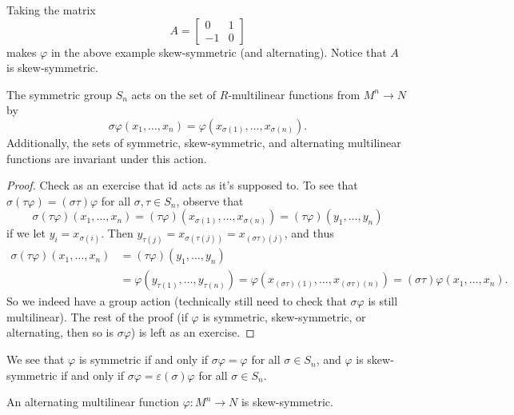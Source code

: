 \begin{example}
  Taking the matrix
  \[
    A = \begin{bmatrix} 0 & 1 \\ -1 & 0 \end{bmatrix}
  \]
  makes $\varphi$ in the above example skew-symmetric
  (and alternating).
  Notice that $A$ is skew-symmetric.
\end{example}

\begin{lemma}
  The symmetric group $S_n$ acts on the
  set of $R$-multilinear functions from $M^n \to N$
  by
  \[
    \sigma \varphi(x_1, \dots, x_n)
    = \varphi(x_{\sigma(1)}, \dots, x_{\sigma(n)}).
  \]
  Additionally, the sets of symmetric, skew-symmetric, and alternating
  multilinear functions are invariant under this action.
\end{lemma}

\begin{proof}
  Check as an exercise that $\mathrm{id}$ acts as it's supposed to.
  To see that $\sigma(\tau \varphi) = (\sigma\tau)\varphi$
  for all $\sigma, \tau \in S_n$, observe that
  \[
    \sigma(\tau \varphi)(x_1, \dots, x_n)
    = (\tau \varphi)(x_{\sigma(1)}, \dots, x_{\sigma(n)})
    = (\tau \varphi)(y_1, \dots, y_n)
  \]
  if we let $y_i = x_{\sigma(i)}$. Then
  $y_{\tau(j)} = x_{\sigma(\tau(j))} = x_{(\sigma\tau)(j)}$,
  and thus
  \begin{align*}
    \sigma(\tau \varphi)(x_1, \dots, x_n)
    &= (\tau \varphi)(y_1, \dots, y_n) \\
    &= \varphi(y_{\tau(1)}, \dots, y_{\tau(n)})
    = \varphi(x_{(\sigma\tau)(1)}, \dots, x_{(\sigma\tau)(n)})
    = (\sigma\tau)\varphi(x_1, \dots, x_n).
  \end{align*}
  So we indeed have a group action (technically still
  need to check that $\sigma \varphi$ is still multilinear).
  The rest of the proof (if $\varphi$ is symmetric,
  skew-symmetric, or alternating, then so is $\sigma \varphi$)
  is left as an exercise.
\end{proof}

\begin{remark}
  We see that $\varphi$ is symmetric if and only if
  $\sigma \varphi = \varphi$ for all $\sigma \in S_n$,
  and
  $\varphi$ is skew-symmetric if and only if
  $\sigma \varphi = \varepsilon(\sigma)\varphi$ for all
  $\sigma \in S_n$.
\end{remark}

\begin{lemma}
  An alternating multilinear function $\varphi : M^n \to N$
  is skew-symmetric.
\end{lemma}

